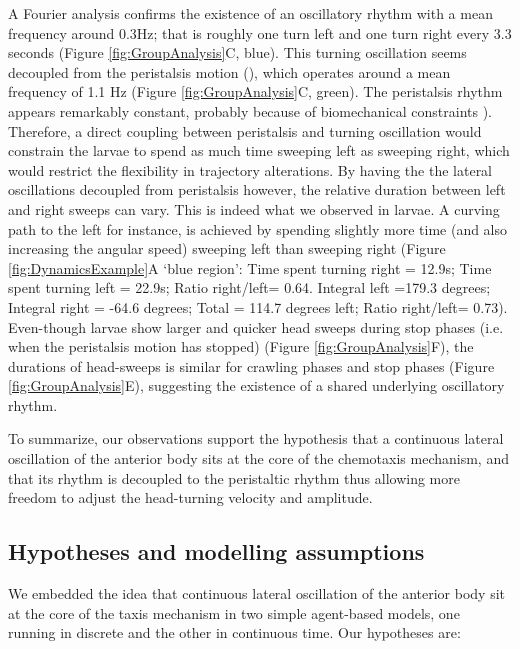 \documentclass[11pt,a4paper]{article}
\begin{document}
A Fourier analysis confirms the existence of an oscillatory rhythm with a mean frequency around 0.3Hz; that is roughly one turn left and one turn right every 3.3 seconds (Figure \ref{fig:GroupAnalysis}C, blue).
 This turning oscillation seems decoupled from the peristalsis motion (), which operates around a mean frequency of 1.1 Hz (Figure \ref{fig:GroupAnalysis}C, green). The peristalsis rhythm appears remarkably constant,  probably because of biomechanical constraints \citep{ross2015model}). Therefore, a direct coupling between peristalsis and turning oscillation would constrain the larvae to spend as much time sweeping left as sweeping right, which would restrict the flexibility in trajectory alterations.
 By having the the lateral oscillations decoupled from peristalsis however, the relative duration between left and right sweeps can vary. This is indeed what we observed in larvae. A curving path to the left for instance, is achieved by spending slightly more time (and also increasing the angular speed) sweeping left than sweeping right (Figure \ref{fig:DynamicsExample}A ‘blue region’:  Time spent turning right = 12.9s; Time spent turning left = 22.9s; Ratio right/left= 0.64. Integral left =179.3 degrees; Integral right = -64.6 degrees; Total = 114.7 degrees left; Ratio right/left= 0.73). Even-though larvae show larger and quicker head sweeps during stop phases (i.e. when the peristalsis motion has stopped) (Figure \ref{fig:GroupAnalysis}F), the durations of head-sweeps is similar for crawling phases and stop phases (Figure \ref{fig:GroupAnalysis}E), suggesting the existence of a shared underlying oscillatory rhythm. 

To summarize, our observations support the hypothesis that a continuous lateral oscillation of the anterior body sits at the core of the chemotaxis mechanism, and that its rhythm is decoupled to the peristaltic rhythm thus allowing more freedom to adjust the head-turning velocity and amplitude.


\subsection{Hypotheses and modelling assumptions}

We embedded the idea that continuous lateral oscillation of the anterior body sit at the core of the taxis mechanism in two simple agent-based models, one running in discrete and the other in continuous time. Our hypotheses are:
\end{document}
